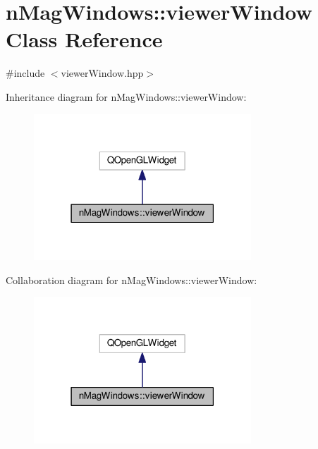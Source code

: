 \hypertarget{classnMagWindows_1_1viewerWindow}{}\section{n\+Mag\+Windows\+:\+:viewer\+Window Class Reference}
\label{classnMagWindows_1_1viewerWindow}


{\ttfamily \#include $<$viewer\+Window.\+hpp$>$}



Inheritance diagram for n\+Mag\+Windows\+:\+:viewer\+Window\+:\nopagebreak
\begin{figure}[H]
\begin{center}
\leavevmode
\includegraphics[width=231pt]{d0/d95/classnMagWindows_1_1viewerWindow__inherit__graph}
\end{center}
\end{figure}


Collaboration diagram for n\+Mag\+Windows\+:\+:viewer\+Window\+:\nopagebreak
\begin{figure}[H]
\begin{center}
\leavevmode
\includegraphics[width=231pt]{d8/d51/classnMagWindows_1_1viewerWindow__coll__graph}
\end{center}
\end{figure}
